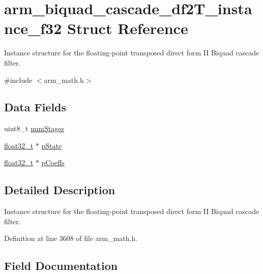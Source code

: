 \hypertarget{structarm__biquad__cascade__df2_t__instance__f32}{}\section{arm\+\_\+biquad\+\_\+cascade\+\_\+df2\+T\+\_\+instance\+\_\+f32 Struct Reference}
\label{structarm__biquad__cascade__df2_t__instance__f32}


Instance structure for the floating-\/point transposed direct form II Biquad cascade filter.  




{\ttfamily \#include $<$arm\+\_\+math.\+h$>$}

\subsection*{Data Fields}
\begin{DoxyCompactItemize}
\item 
uint8\+\_\+t \hyperlink{structarm__biquad__cascade__df2_t__instance__f32_a3615af038f56917909e0370c11bc2ec7}{num\+Stages}
\item 
\hyperlink{arm__math_8h_a4611b605e45ab401f02cab15c5e38715}{float32\+\_\+t} $\ast$ \hyperlink{structarm__biquad__cascade__df2_t__instance__f32_a335c87e6fdc4b96601d95a5de8b9c463}{p\+State}
\item 
\hyperlink{arm__math_8h_a4611b605e45ab401f02cab15c5e38715}{float32\+\_\+t} $\ast$ \hyperlink{structarm__biquad__cascade__df2_t__instance__f32_aacbb8dd8eeba4b21fc2bb40076405ee3}{p\+Coeffs}
\end{DoxyCompactItemize}


\subsection{Detailed Description}
Instance structure for the floating-\/point transposed direct form II Biquad cascade filter. 

Definition at line 3608 of file arm\+\_\+math.\+h.



\subsection{Field Documentation}
